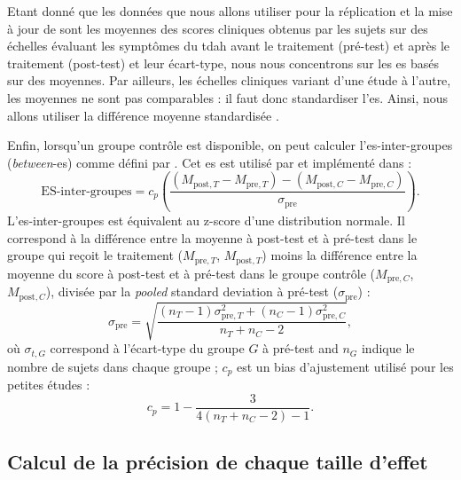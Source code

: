 Etant donné que les données que nous allons utiliser pour la réplication et la mise à jour de \citet{Cortese2016} sont les moyennes des 
scores cliniques obtenus par les sujets sur des échelles évaluant les symptômes du \gls{tdah} avant le traitement (pré-test) et 
après le traitement (post-test) et leur écart-type, nous nous concentrons sur 
les \gls{es} basés sur des moyennes. Par ailleurs, les échelles cliniques variant 
d'une étude à l'autre, les moyennes ne sont pas comparables : il faut donc standardiser l'\gls{es}. 
Ainsi, nous allons utiliser la différence moyenne standardisée \citep{Cortese2016, Micoulaud2014}.

Enfin, lorsqu'un groupe contrôle est disponible, on peut calculer l'\gls{es}-inter-groupes (\textit{between}-\gls{es}) comme défini par \citet{Morris2008}.
Cet \gls{es} est utilisé par \citet{Cortese2016, Micoulaud2014} et implémenté dans \citet{Bussalb2019clinical} :
\begin{equation}
\label{eq:metareview_effect_size_between}
\text{ES-inter-groupes} = c_p \left(\frac{(M_{\text{post},T} - M_{\text{pre},T}) - (M_{\text{post},C} - M_{\text{pre},C}) }{\sigma_{\text{pre}}} \right).
\end{equation} 
L'\gls{es}-inter-groupes est équivalent au z-score d'une distribution normale. Il correspond à la différence entre la moyenne à post-test et à pré-test 
dans le groupe qui reçoit le traitement ($M_{\text{pre},T}$, $M_{\text{post},T}$) moins la différence entre la moyenne du score à post-test et à pré-test 
dans le groupe contrôle ($M_{\text{pre},C}$, $M_{\text{post},C}$), divisée par la \textit{pooled} standard deviation à pré-test ($\sigma_{\text{pre}}$) :
\begin{equation}
\label{eq:stats_metareview_std_pre}
\sigma_{\text{pre}} = \sqrt{\frac{(n_T - 1)\sigma_{\text{pre},T}^2 + (n_C - 1)\sigma_{\text{pre},C}^2} {n_T + n_C - 2}},
\end{equation}
où $\sigma_{t,G}$ correspond à l'écart-type du groupe $G$ à pré-test and $n_G$ indique le nombre de sujets dans chaque groupe ; 
$c_p$ est un bias d'ajustement utilisé pour les petites études :
\begin{equation}
\label{eq:metareview_correction_factor}
c_p =  1 - \frac{3} {4(n_T + n_C - 2) - 1}.
\end{equation} 

\subsection{Calcul de la précision de chaque taille d'effet}

